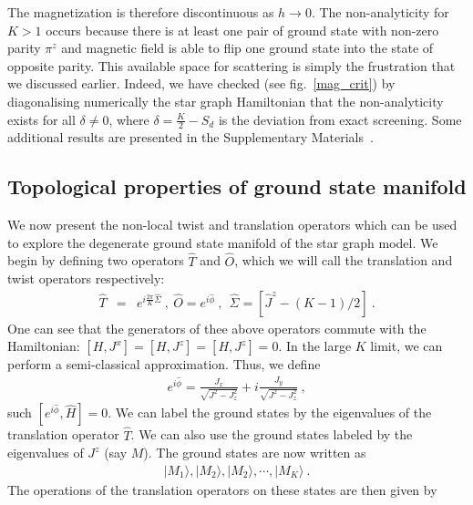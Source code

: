 \documentclass[reprint,prb,superscriptaddress]{revtex4-2}
\begin{document}
The magnetization is therefore discontinuous as \(h\to 0\). The non-analyticity for \(K>1\) occurs because there is at least one pair of ground state with non-zero parity \(\pi^z\) and magnetic field is able to flip one ground state into the state of opposite parity. This available space for scattering is simply the frustration that we discussed earlier. Indeed, we have checked (see fig.~\ref{mag_crit}) {\color{blue} by diagonalising numerically the star graph Hamiltonian} that the non-analyticity exists for all \(\delta \neq 0\), where \(\delta = \frac{K}{2} - S_{d}\) is the deviation from exact screening. 
Some additional results are presented in the Supplementary Materials~\cite{SM}.
\subsection{Topological properties of ground state manifold}
\label{sec:topo_ground_state}
We now present the non-local twist and translation operators which can be used to explore the degenerate ground state manifold of the star graph model.
We begin by defining two operators $\hat{T}$ and $\hat{O}$, which we will call the translation and twist operators respectively: 
\begin{eqnarray}
\hat{T} &=& e^{i\frac{2\pi}{K} \hat{\Sigma}} ~,~\hat{O} = e^{i\hat{\phi}}~,~~\hat{\Sigma}=[\hat{J}^z-(K-1)/2]~.
\end{eqnarray}
One can see that the generators of thee above operators commute with the Hamiltonian: $[H,J^x]=[H,J^z]=[H,J^z]=0$. In the large \(K\) limit, we can perform a semi-classical approximation. 
Thus, we define
\begin{eqnarray}
e^{i\hat{\phi}} = \frac{J_{x}}{\sqrt{J^{2} - J_{z}^{2}}} + i\frac{J_{y}}{\sqrt{J^{2} - J_{z}^{2}}}~,
\end{eqnarray}
such $[e^{i\hat{\phi}},\hat{H}]=0$. We can label the ground states by the eigenvalues of the translation operator $\hat{T}$. We can also use the ground states labeled by the eigenvalues of $J^z$ (say $M$). The ground states are now written as 
\begin{eqnarray}
|M_1\rangle,|M_2\rangle,|M_2\rangle,\cdots ,|M_K\rangle~.
\end{eqnarray}
The operations of the translation operators on these states are then given by
\end{document}

